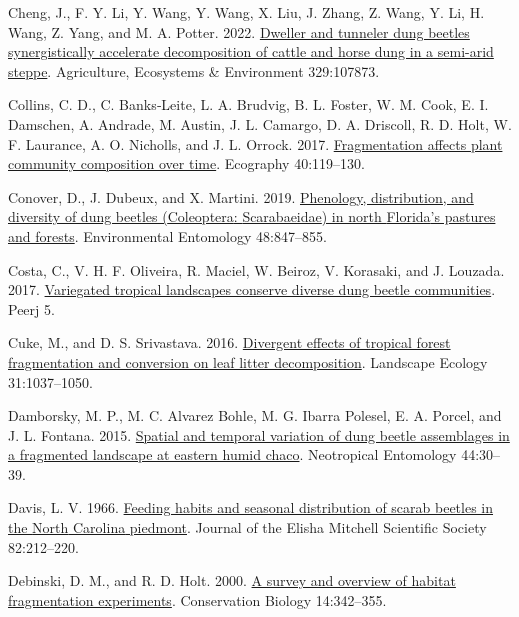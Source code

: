 \documentclass[
  man, donotrepeattitle]{apa6}
\newlength{\cslhangindent}
\newenvironment{CSLReferences}[2] %
 {\begin{list}{}{%
  \setlength{\itemindent}{0pt}
  \setlength{\leftmargin}{0pt}
  \setlength{\parsep}{0pt}
  \ifodd #1
   \setlength{\leftmargin}{\cslhangindent}
   \setlength{\itemindent}{-1\cslhangindent}
  \fi
  \setlength{\itemsep}{#2\baselineskip}}}
 {\end{list}}
\begin{document}
\begin{CSLReferences}{1}{0}
Cheng, J., F. Y. Li, Y. Wang, Y. Wang, X. Liu, J. Zhang, Z. Wang, Y. Li, H. Wang, Z. Yang, and M. A. Potter. 2022. \href{https://doi.org/10.1016/j.agee.2022.107873}{Dweller and tunneler dung beetles synergistically accelerate decomposition of cattle and horse dung in a semi-arid steppe}. Agriculture, Ecosystems \& Environment 329:107873.

Collins, C. D., C. Banks‐Leite, L. A. Brudvig, B. L. Foster, W. M. Cook, E. I. Damschen, A. Andrade, M. Austin, J. L. Camargo, D. A. Driscoll, R. D. Holt, W. F. Laurance, A. O. Nicholls, and J. L. Orrock. 2017. \href{https://doi.org/10.1111/ecog.02607}{Fragmentation affects plant community composition over time}. Ecography 40:119--130.

Conover, D., J. Dubeux, and X. Martini. 2019. \href{https://doi.org/10.1093/ee/nvz068}{Phenology, distribution, and diversity of dung beetles ({Coleoptera}: {Scarabaeidae}) in north {Florida}'s pastures and forests}. Environmental Entomology 48:847--855.

Costa, C., V. H. F. Oliveira, R. Maciel, W. Beiroz, V. Korasaki, and J. Louzada. 2017. \href{https://doi.org/10.7717/peerj.3125}{Variegated tropical landscapes conserve diverse dung beetle communities}. Peerj 5.

Cuke, M., and D. S. Srivastava. 2016. \href{https://doi.org/10.1007/s10980-015-0316-z}{Divergent effects of tropical forest fragmentation and conversion on leaf litter decomposition}. Landscape Ecology 31:1037--1050.

Damborsky, M. P., M. C. Alvarez Bohle, M. G. Ibarra Polesel, E. A. Porcel, and J. L. Fontana. 2015. \href{https://doi.org/10.1007/s13744-014-0257-2}{Spatial and temporal variation of dung beetle assemblages in a fragmented landscape at eastern humid chaco}. Neotropical Entomology 44:30--39.

Davis, L. V. 1966. \href{https://www.jstor.org/stable/24333363}{Feeding habits and seasonal distribution of scarab beetles in the {North} {Carolina} piedmont}. Journal of the Elisha Mitchell Scientific Society 82:212--220.

Debinski, D. M., and R. D. Holt. 2000. \href{https://doi.org/10.1046/j.1523-1739.2000.98081.x}{A survey and overview of habitat fragmentation experiments}. Conservation Biology 14:342--355.


\end{CSLReferences}
\end{document}
